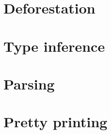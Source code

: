 \documentclass[a4paper, openany]{article}
\begin{document}
\section{Deforestation}
\label{sec:appdeforest}


\section{Type inference}
\label{sec:appinfer}





\section{Parsing}
\label{sec:org4372218}


\section{Pretty printing}
\label{sec:orgcfe755f}

\end{document}
